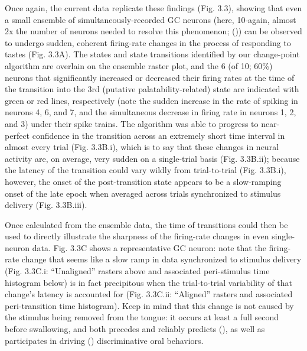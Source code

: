 \begin{refsection}
Once again, the current data replicate these findings (Fig. 3.3), showing that even a small ensemble of simultaneously-recorded GC neurons (here, 10-again, almost 2x the number of neurons needed to resolve this phenomenon; (\cite{jones2007a})) can be observed to undergo sudden, coherent firing-rate changes in the process of responding to tastes (Fig. 3.3A). The states and state transitions identified by our change-point algorithm are overlain on the ensemble raster plot, and the 6 (of 10; 60\%) neurons that significantly increased or decreased their firing rates at the time of the transition into the 3rd (putative palatability-related) state are indicated with green or red lines, respectively (note the sudden increase in the rate of spiking in neurons 4, 6, and 7, and the simultaneous decrease in firing rate in neurons 1, 2, and 3) under their spike trains. The algorithm was able to progress to near-perfect confidence in the transition across an extremely short time interval in almost every trial (Fig. 3.3B.i), which is to say that these changes in neural activity are, on average, very sudden on a single-trial basis (Fig. 3.3B.ii); because the latency of the transition could vary wildly from trial-to-trial (Fig. 3.3B.i), however, the onset of the post-transition state appears to be a slow-ramping onset of the late epoch when averaged across trials synchronized to stimulus delivery (Fig. 3.3B.iii). 

Once calculated from the ensemble data, the time of transitions could then be used to directly illustrate the sharpness of the firing-rate changes in even single-neuron data. Fig. 3.3C shows a representative GC neuron: note that the firing-rate change that seems like a slow ramp in data synchronized to stimulus delivery (Fig. 3.3C.i: “Unaligned” rasters above and associated peri-stimulus time histogram below) is in fact precipitous when the trial-to-trial variability of that change’s latency is accounted for (Fig. 3.3C.ii: “Aligned” rasters and associated peri-transition time histogram). Keep in mind that this change is not caused by the stimulus being removed from the tongue: it occurs at least a full second before swallowing, and both precedes and reliably predicts (\cite{sadacca2016a}), as well as participates in driving (\cite{mukherjee2019a}) discriminative oral behaviors.


\end{refsection}

